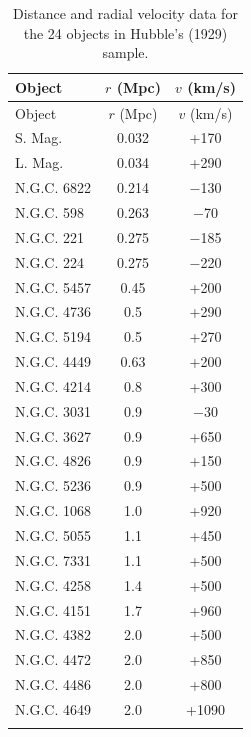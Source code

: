 \documentclass[11pt]{article}
\begin{document}
{\small
\renewcommand{\arraystretch}{0.8}
\begin{longtable}{lcc}
\toprule
Object & $r$ (Mpc) & $v$ (km/s) \\
\midrule
\endfirsthead
\toprule
Object & $r$ (Mpc) & $v$ (km/s) \\
\midrule
\endhead
\bottomrule
\endfoot
\bottomrule
\endlastfoot
S. Mag. & 0.032 & +170 \\
L. Mag. & 0.034 & +290 \\
N.G.C. 6822 & 0.214 & $-$130 \\
N.G.C. 598 & 0.263 & $-$70 \\
N.G.C. 221 & 0.275 & $-$185 \\
N.G.C. 224 & 0.275 & $-$220 \\
N.G.C. 5457 & 0.45 & +200 \\
N.G.C. 4736 & 0.5 & +290 \\
N.G.C. 5194 & 0.5 & +270 \\
N.G.C. 4449 & 0.63 & +200 \\
N.G.C. 4214 & 0.8 & +300 \\
N.G.C. 3031 & 0.9 & $-$30 \\
N.G.C. 3627 & 0.9 & +650 \\
N.G.C. 4826 & 0.9 & +150 \\
N.G.C. 5236 & 0.9 & +500 \\
N.G.C. 1068 & 1.0 & +920 \\
N.G.C. 5055 & 1.1 & +450 \\
N.G.C. 7331 & 1.1 & +500 \\
N.G.C. 4258 & 1.4 & +500 \\
N.G.C. 4151 & 1.7 & +960 \\
N.G.C. 4382 & 2.0 & +500 \\
N.G.C. 4472 & 2.0 & +850 \\
N.G.C. 4486 & 2.0 & +800 \\
N.G.C. 4649 & 2.0 & +1090 \\
\caption{Distance and radial velocity data for the 24 objects in Hubble's (1929) sample.}
\label{tab:hubble1929_data} \\
\end{longtable}
}
\end{document}
